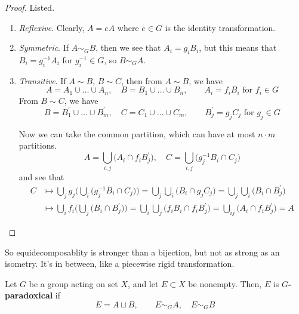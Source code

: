   \begin{proof}
    Listed. 
    \begin{enumerate}
      \item \textit{Reflexive}. Clearly, $A = e A$ where $e \in G$ is the identity transformation. 
      \item \textit{Symmetric}. If $A \sim_G B$, then we see that $A_i = g_i B_i$, but this means that $B_i = g_i^{-1} A_i$ for $g_i^{-1} \in G$, so $B \sim_G A$. 
      \item \textit{Transitive}. If $A \sim B$, $B \sim C$, then from $A \sim B$, we have 
        \begin{equation}
          A = A_1 \cup \ldots \cup A_n, \quad B = B_1 \cup \ldots \cup B_n, \qquad A_i = f_i B_i \text{ for } f_i \in G
        \end{equation}
        From $B \sim C$, we have 
        \begin{equation}
          B = B_1^\prime \cup \ldots \cup B_m^\prime, \quad C = C_1 \cup \ldots \cup C_m, \qquad B_j^\prime = g_j C_j \text{ for } g_j \in G
        \end{equation}

        Now we can take the common partition, which can have at most $n \cdot m$ partitions. 
        \begin{equation}
          A = \bigcup_{i, j} \big( A_i \cap f_i B_j^\prime \big), \quad C = \bigcup_{i, j} \big( g_j^{-1} B_i \cap C_j \big) 
        \end{equation}
        and see that 
        \begin{align}
          C & \mapsto \bigcup_j g_j \bigg( \bigcup_i \big( g_j^{-1} B_i \cap C_j \big) \bigg) = \bigcup_j \bigcup_i \big( B_i \cap g_j C_j \big) = \bigcup_j \bigcup_i \big( B_i \cap B^\prime_j \big) \\ 
            & \mapsto \bigcup_i f_i \bigg( \bigcup_j \big( B_i \cap B^\prime_j \big) \bigg) = \bigcup_i \bigcup_j \big( f_i B_i \cap f_i B_j^\prime \big) = \bigcup_{ij} \big( A_i \cap f_i B^\prime_j \big) = A
        \end{align}
    \end{enumerate}
  \end{proof}

  So equidecomposablity is stronger than a bijection, but not as strong as an isometry. It's in between, like a piecewise rigid transformation. 

  \begin{definition}
    \label{def:paradoxical-sets}
    Let $G$ be a group acting on set $X$, and let $E \subset X$ be nonempty. Then, $E$ is \textbf{$G$-paradoxical} if 
    \begin{equation}
      E = A \sqcup B, \qquad E \sim_G A, \quad E \sim_G B
    \end{equation}
  \end{definition}

